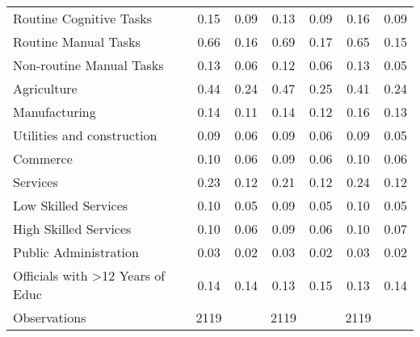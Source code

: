 {\begin{tabular}{l*{3}{cc}}
Routine Cognitive Tasks&        0.15&        0.09&        0.13&        0.09&        0.16&        0.09\\
Routine Manual Tasks&        0.66&        0.16&        0.69&        0.17&        0.65&        0.15\\
Non-routine Manual Tasks&        0.13&        0.06&        0.12&        0.06&        0.13&        0.05\\
Agriculture         &        0.44&        0.24&        0.47&        0.25&        0.41&        0.24\\
Manufacturing       &        0.14&        0.11&        0.14&        0.12&        0.16&        0.13\\
Utilities and construction&        0.09&        0.06&        0.09&        0.06&        0.09&        0.05\\
Commerce            &        0.10&        0.06&        0.09&        0.06&        0.10&        0.06\\
Services            &        0.23&        0.12&        0.21&        0.12&        0.24&        0.12\\
Low Skilled Services&        0.10&        0.05&        0.09&        0.05&        0.10&        0.05\\
High Skilled Services&        0.10&        0.06&        0.09&        0.06&        0.10&        0.07\\
Public Administration&        0.03&        0.02&        0.03&        0.02&        0.03&        0.02\\
Officials with >12 Years of Educ&        0.14&        0.14&        0.13&        0.15&        0.13&        0.14\\
\hline
Observations        &        2119&            &        2119&            &        2119&            \\
\hline\hline
\end{tabular}
}
